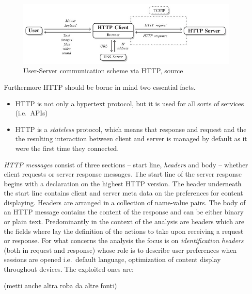 \documentclass[
  12pt,
  a4paper,
  oneside]{book}
\providecommand{\tightlist}{%
  \setlength{\itemsep}{0pt}\setlength{\parskip}{0pt}}
\theoremstyle{definition}
\theoremstyle{definition}
\theoremstyle{definition}
\theoremstyle{remark}
\begin{document}
\begin{figure}
\centering
\includegraphics{images/http_schema.jpg}
\caption{\label{fig:httpschema} User-Server communication scheme via HTTP, source \citet{automateddatacollection}}
\end{figure}

Furthermore HTTP should be borne in mind two essential facts.

\begin{itemize}
\tightlist
\item
  HTTP is not only a hypertext protocol, but it is used for all sorts of services (i.e.~APIs)
\item
  HTTP is a \emph{stateless} protocol, which means that response and request and the the resulting interaction between client and server is managed by default as it were the first time they connected.
\end{itemize}

\emph{HTTP messages} consist of three sections -- start line, \emph{headers} and body -- whether client requests or server response messages. The start line of the server response begins with a declaration on the highest HTTP version. The header underneath the start line contains client and server meta data on the preferences for content displaying. Headers are arranged in a collection of name-value pairs.
The body of an HTTP message contains the content of the response and can be either binary or plain text. Predominantly in the context of the analysis are headers which are the fields where lay the definition of the actions to take upon receiving a request or response. For what concerns the analysis the focus is on \emph{identification headers} (both in request and response) whose role is to describe user preferences when sessions are opened i.e.~default language, optimization of content display throughout devices. The exploited ones are:

(metti anche altra roba da altre fonti)
\end{document}
